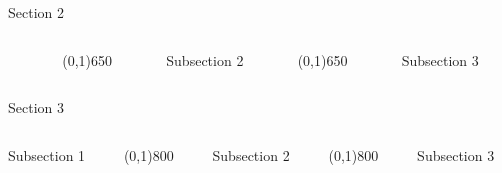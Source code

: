 \documentclass[final]{beamer}
\newcommand{\heading}[1]{\alert{\large #1}\\}
\theoremstyle{plain}
\begin{document}
\begin{frame}{}
\begin{block}{Section 2}
\begin{columns}[T]
\begin{column}{0.25\textwidth}
     
   \end{column}
   
   \begin{column}{0.005\textwidth}\linethickness{0.3ex} %
      \color{myPurple} \line(0,1){650}
   \end{column} %
   
   \begin{column}{0.3\textwidth} %
	\heading{Subsection 2}
	
   \end{column}
   
   \begin{column}{0.005\textwidth}\linethickness{0.3ex} %
      \color{myPurple} \line(0,1){650}
   \end{column} %
   
   
   \begin{column}{0.3\textwidth}%
   
      \heading{Subsection 3}
   
   \end{column} %
   
\end{columns}
\end{block}

\begin{block}{Section 3}
  \begin{columns}[T]
    \begin{column}{0.35\textwidth}
      \heading{Subsection 1}

    \end{column}
   \begin{column}{0.005\textwidth}\linethickness{0.3ex}
      \color{myPurple} \line(0,1){800}
   \end{column} %
   
    \begin{column}{0.23\textwidth}
    \heading{Subsection 2}
      
    \end{column}
    
    \begin{column}{0.005\textwidth}\linethickness{0.3ex} %
      \color{myPurple} \line(0,1){800}
   \end{column} %
    \begin{column}{0.3\textwidth}
    \heading{Subsection 3}
  

\end{column}
\end{columns}
\end{block}
\end{frame}
\end{document}

